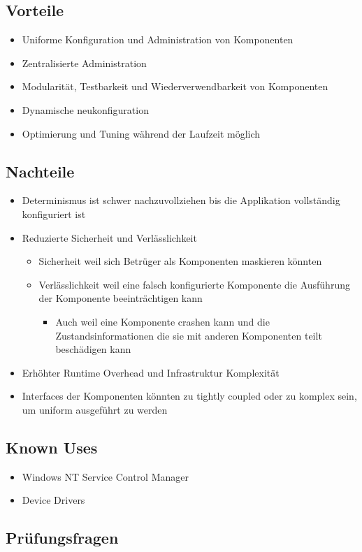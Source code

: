 \subsection*{Vorteile}

\begin{itemize}
	\item Uniforme Konfiguration und Administration von Komponenten
	\item Zentralisierte Administration
	\item Modularität, Testbarkeit und Wiederverwendbarkeit von Komponenten
	\item Dynamische neukonfiguration
	\item Optimierung und Tuning während der Laufzeit möglich
\end{itemize}

\subsection*{Nachteile}

\begin{itemize}
	\item Determinismus ist schwer nachzuvollziehen bis die Applikation vollständig konfiguriert ist
	\item Reduzierte Sicherheit und Verlässlichkeit
	\begin{itemize}
		\item Sicherheit weil sich Betrüger als Komponenten maskieren könnten
		\item Verlässlichkeit weil eine falsch konfigurierte Komponente die Ausführung der Komponente beeinträchtigen kann
		\begin{itemize}
			\item Auch weil eine Komponente crashen kann und die Zustandsinformationen die sie mit anderen Komponenten teilt beschädigen kann
		\end{itemize}
	\end{itemize}
	\item Erhöhter Runtime Overhead und Infrastruktur Komplexität
	\item Interfaces der Komponenten könnten zu tightly coupled oder zu komplex sein, um uniform ausgeführt zu werden
\end{itemize}

\subsection*{Known Uses}

\begin{itemize}
	\item Windows NT Service Control Manager
	\item Device Drivers
\end{itemize}

\subsection*{Prüfungsfragen}




